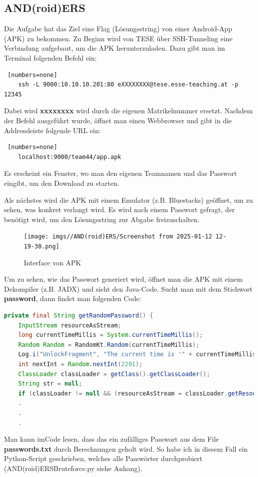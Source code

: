 \documentclass[12pt, a4paper, titlepage, oneside]{scrartcl}
\begin{document}
	\subsection{AND(roid)ERS}
	Die Aufgabe hat das Ziel eine Flag (Lösungsstring) von einer Android-App (APK) zu bekommen. Zu Beginn wird von TESE über SSH-Tunneling eine Verbindung aufgebaut, um die APK herunterzuladen. Dazu gibt man im Terminal folgenden Befehl ein: 
    \begin{lstlisting} [numbers=none]
    ssh -L 9000:10.10.10.201:80 eXXXXXXXX@tese.esse-teaching.at -p 12345
        \end{lstlisting}
    Dabei wird \textbf{xxxxxxxx} wird durch die eigenen Matrikelnummer ersetzt. Nachdem der Befehl ausgeführt wurde, öffnet man einen Webbrowser und gibt in die Addressleiste folgende URL ein: 
    \begin{lstlisting} [numbers=none]
    localhost:9000/team44/app.apk
    \end{lstlisting}
    Es erscheint ein Fenster, wo man den eigenen Teamnamen und das Passwort eingibt, um den Download zu starten. \newline
    
    \noindent Als nächstes wird die APK mit einem Emulator (z.B. Bluestacks) geöffnet, um zu sehen, was konkret verlangt wird. Es wird nach einem Passwort gefragt, der benötigt wird, um den Lösungsstring zur Abgabe freizuschalten. \newline
    
    \begin{figure}
        \centering
        \texttt{[image: imgs//AND(roid)ERS/Screenshot from 2025-01-12 12-19-30.png]}
        \caption{Interface von APK}
        \label{fig:enter-label}
    \end{figure}
    
    \noindent Um zu sehen, wie das Passwort generiert wird, öffnet man die APK mit einem Dekompiler (z.B. JADX) und sieht den Java-Code. Sucht man mit dem Stichwort \textbf{password}, dann findet man folgenden Code:
    \begin{lstlisting}[language=java]
    private final String getRandomPassword() {
    InputStream resourceAsStream;
    long currentTimeMillis = System.currentTimeMillis();
    Random Random = RandomKt.Random(currentTimeMillis);
    Log.i("UnlockFragment", "The current time is '" + currentTimeMillis + "'");
    int nextInt = Random.nextInt(2291);
    ClassLoader classLoader = getClass().getClassLoader();
    String str = null;
    if (classLoader != null && (resourceAsStream = classLoader.getResourceAsStream("passwords.txt")) != null)
    .
    .
    .
    \end{lstlisting}
    Man kann imCode lesen, dass das ein zufälliges Passwort aus dem File \textbf{passwords.txt} durch Berechnungen geholt wird. So habe ich in diesem Fall ein Python-Script geschrieben, welches alle Passwörter durchprobiert (AND(roid)ERSBruteforce.py siehe Anhang).
\end{document}
